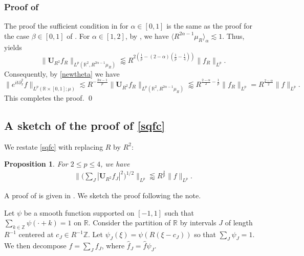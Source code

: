 \documentclass[11pt]{amsart}
\newtheorem{prop}[theorem]{Proposition}
\theoremstyle{definition}
\theoremstyle{remark}
\newcommand{\R}{\mathbb{R}}
\newcommand{\Z}{\mathbb{Z}}
\newcommand{\bU}{\mathbf{U}}
\newcommand{\les}{\lesssim}
\newcommand{\less}{\lessapprox}
\newcommand{\inn}[1]{\langle  #1 \rangle}
\begin{document}
\subsubsection{Proof of }

The proof the sufficient condition in  for $\alpha\in [0,1]$ is the same as the proof for the case $\beta \in [0,1]$ of . For $\alpha\in [1,2]$, by , we have $\inn{R^{2\alpha-1} \mu_R}_{\alpha} \les 1$. Thus,  yields
  \[ \big\| \bU_{R^2} f_R \big\|_{L^p(\R^2, R^{2\alpha-1} \mu_R)} \less R^{2\left(\frac{1}{p}-(2-\alpha)\left(\frac{1}{p}-\frac{1}{4}\right)\right)} \| f_R\|_{L^p}.   \]
     Consequently, by \eqref{newtheta} we have  
    \[  \big\| e^{it\partial_x^2}f \big\|_{L^p(\R\times[0,1];\mu)} \les R^{-\frac{2\alpha-1}{p}} \| \bU_{R^2} f_R \|_{L^p(\R^2,R^{2\alpha-1} \mu_R)}  \less R^{\frac{2-\alpha}{2}-\frac1p} \| f_R\|_{L^p}
    =R^{\frac{2-\alpha}{2}} \| f\|_{L^p}. \]
This completes the proof. \qed


\subsection{A sketch of the proof of \eqref{sqfc}} \label{sec:sqfc}
We restate \eqref{sqfc} with replacing $R$ by $R^2$:
\begin{prop}\label{prop:sqfc}
   For $2\le p \le 4$, we have
\begin{align}\label{eq0}
\Big\| \big(\sum_J |\mathbf U_{R^2} f_J|^2\big)^{1/2} \Big\|_{L^p}
\less R^{\frac2p}\|f\|_{L^p}.
\end{align}
\end{prop}
A proof of  is given in \cite{Yung}. We sketch the proof following the note. 

Let $\psi$ be a smooth function supported on $[-1,1]$ such that $\sum_{k\in \Z}\psi(\cdot+k)=1$ on $\R$. Consider the partition of $\R$ by intervals $J$ of length $R^{-1}$ centered at $c_J \in R^{-1} \Z$. 
Let $\psi_J(\xi)=\psi(R(\xi-c_J))$ so that $\sum_{J} \psi_J = 1$. We then decompose $f=\sum_J f_J$, where $\widehat f_J=\widehat f \psi_J$.
\end{document}
